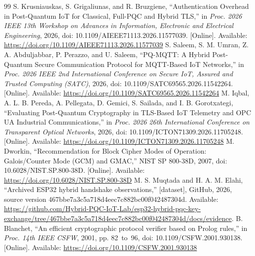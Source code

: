 \documentclass[pdflatex,sn-mathphys-num]{sn-jnl}
\begin{document}
\begin{thebibliography}{99}
 S. Krusniauskas, S. Grigaliunas, and R. Bruzgiene, ``Authentication Overhead in Post-Quantum IoT for Classical, Full-PQC and Hybrid TLS,'' in \textit{Proc. 2026 IEEE 13th Workshop on Advances in Information, Electronic and Electrical Engineering}, 2026, doi: 10.1109/AIEEE71113.2026.11577039. [Online]. Available: \url{https://doi.org/10.1109/AIEEE71113.2026.11577039}
 S. Saleem, S. M. Umran, Z. A. Abduljabbar, P. Perazzo, and U. Saleem, ``PQ-MQTT: A Hybrid Post-Quantum Secure Communication Protocol for MQTT-Based IoT Networks,'' in \textit{Proc. 2026 IEEE 2nd International Conference on Secure IoT, Assured and Trusted Computing (SATC)}, 2026, doi: 10.1109/SATC69565.2026.11542264. [Online]. Available: \url{https://doi.org/10.1109/SATC69565.2026.11542264}
 M. Iqbal, A. L. B. Pereda, A. Pellegata, D. Gemici, S. Sailada, and I. B. Gorotxategi, ``Evaluating Post-Quantum Cryptography in TLS-Based IoT Telemetry and OPC UA Industrial Communications,'' in \textit{Proc. 2026 26th International Conference on Transparent Optical Networks}, 2026, doi: 10.1109/ICTON71309.2026.11705248. [Online]. Available: \url{https://doi.org/10.1109/ICTON71309.2026.11705248}
 M. Dworkin, ``Recommendation for Block Cipher Modes of Operation: Galois/Counter Mode (GCM) and GMAC,'' NIST SP 800-38D, 2007, doi: 10.6028/NIST.SP.800-38D. [Online]. Available: \url{https://doi.org/10.6028/NIST.SP.800-38D}
M. S. Muqtada and H. A. M. Elahi, ``Archived ESP32 hybrid handshake observations,'' [dataset], GitHub, 2026, source version 467bbe7a3c5a718d4eec7c882bc00f042487304d. Available: \url{https://github.com/Hybrid-PQC-IoT-Lab/esp32-hybrid-pqc-key-exchange/tree/467bbe7a3c5a718d4eec7c882bc00f042487304d/docs/evidence}.
 B. Blanchet, ``An efficient cryptographic protocol verifier based on Prolog rules,'' in \textit{Proc. 14th IEEE CSFW}, 2001, pp. 82~to~96, doi: 10.1109/CSFW.2001.930138. [Online]. Available: \url{https://doi.org/10.1109/CSFW.2001.930138}
\end{thebibliography}
\end{document}
